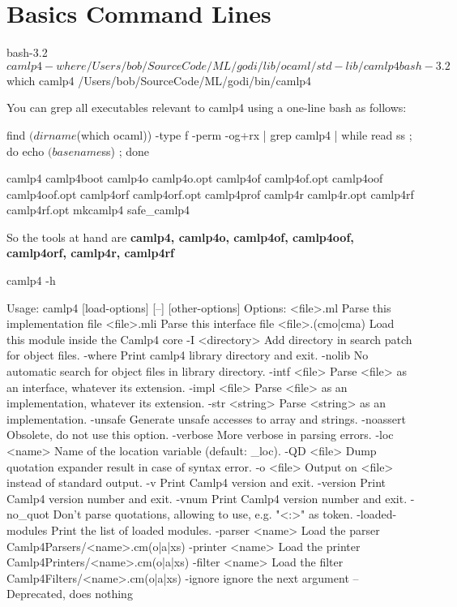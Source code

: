 \section{Basics Command Lines}


\begin{alternate}
bash-3.2$ camlp4 -where
/Users/bob/SourceCode/ML/godi/lib/ocaml/std-lib/camlp4
bash-3.2$ which camlp4
/Users/bob/SourceCode/ML/godi/bin/camlp4
\end{alternate}


You can grep all executables relevant to camlp4 using a one-line bash
as follows:
\begin{bluetext}
find $(dirname $(which ocaml)) -type f -perm -og+rx | grep camlp4 |
while read ss ; do echo $(basename $ss) ; done
\end{bluetext}

\begin{bluetext}  
camlp4
camlp4boot
camlp4o
camlp4o.opt
camlp4of
camlp4of.opt
camlp4oof
camlp4oof.opt
camlp4orf
camlp4orf.opt
camlp4prof
camlp4r
camlp4r.opt
camlp4rf
camlp4rf.opt
mkcamlp4
safe_camlp4
\end{bluetext}

So the tools at hand are \textbf{camlp4, camlp4o, camlp4of, camlp4oof,
  camlp4orf, camlp4r, camlp4rf }

\begin{bluetext}
camlp4 -h

Usage: camlp4 [load-options] [--] [other-options]
Options:
<file>.ml        Parse this implementation file
<file>.mli       Parse this interface file
<file>.(cmo|cma) Load this module inside the Camlp4 core
  -I <directory>   Add directory in search patch for object files.
  -where           Print camlp4 library directory and exit.
  -nolib           No automatic search for object files in library directory.
  -intf <file>     Parse <file> as an interface, whatever its extension.
  -impl <file>     Parse <file> as an implementation, whatever its extension.
  -str <string>    Parse <string> as an implementation.
  -unsafe          Generate unsafe accesses to array and strings.
  -noassert        Obsolete, do not use this option.
  -verbose         More verbose in parsing errors.
  -loc <name>      Name of the location variable (default: _loc).
  -QD <file>       Dump quotation expander result in case of syntax error.
  -o <file>        Output on <file> instead of standard output.
  -v               Print Camlp4 version and exit.
  -version         Print Camlp4 version number and exit.
  -vnum            Print Camlp4 version number and exit.
  -no_quot         Don't parse quotations, allowing to use, e.g. "<:>" as token.
  -loaded-modules  Print the list of loaded modules.
  -parser <name>   Load the parser Camlp4Parsers/<name>.cm(o|a|xs)
  -printer <name>  Load the printer Camlp4Printers/<name>.cm(o|a|xs)
  -filter <name>   Load the filter Camlp4Filters/<name>.cm(o|a|xs)
  -ignore          ignore the next argument
  --               Deprecated, does nothing    
\end{bluetext}

